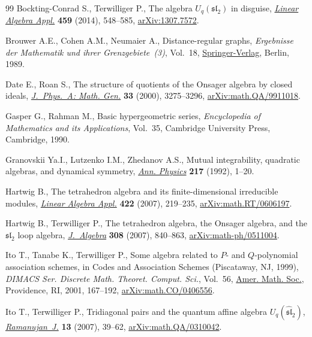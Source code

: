 \documentclass[pdftex]{sigma}
\numberwithin{equation}{section}
\begin{document}
\begin{thebibliography}{99}
Bockting-Conrad S., Terwilliger P., The algebra {$U_q(\mathfrak{sl}_2)$} in
 disguise, \href{https://doi.org/10.1016/j.laa.2014.07.022}{\textit{Linear Algebra Appl.}} \textbf{459} (2014), 548--585,
 \href{https://arxiv.org/abs/1307.7572}{arXiv:1307.7572}.

Brouwer A.E., Cohen A.M., Neumaier A., Distance-regular graphs,
 \textit{Ergebnisse der Mathematik und ihrer Grenzgebiete~(3)}, Vol.~18,
 \href{https://doi.org/10.1007/978-3-642-74341-2}{Springer-Verlag}, Berlin, 1989.

Date E., Roan S., The structure of quotients of the {O}nsager algebra by
 closed ideals, \href{https://doi.org/10.1088/0305-4470/33/16/316}{\textit{J.~Phys.~A: Math. Gen.}} \textbf{33} (2000),
 3275--3296, \href{https://arxiv.org/abs/math.QA/9911018}{arXiv:math.QA/9911018}.

Gasper G., Rahman M., Basic hypergeometric series, \textit{Encyclopedia of
 Mathematics and its Applications}, Vol.~35, Cambridge University Press,
 Cambridge, 1990.

Granovskii Ya.I., Lutzenko I.M., Zhedanov A.S., Mutual integrability, quadratic
 algebras, and dynamical symmetry, \href{https://doi.org/10.1016/0003-4916(92)90336-K}{\textit{Ann. Physics}} \textbf{217} (1992),
 1--20.

Hartwig B., The tetrahedron algebra and its finite-dimensional irreducible
 modules, \href{https://doi.org/10.1016/j.laa.2006.09.024}{\textit{Linear Algebra Appl.}} \textbf{422} (2007), 219--235,
 \href{https://arxiv.org/abs/math.RT/0606197}{arXiv:math.RT/0606197}.

Hartwig B., Terwilliger P., The tetrahedron algebra, the {O}nsager algebra, and
 the {$\mathfrak{sl}_2$} loop algebra, \href{https://doi.org/10.1016/j.jalgebra.2006.09.011}{\textit{J.~Algebra}} \textbf{308}
 (2007), 840--863, \href{https://arxiv.org/abs/math-ph/0511004}{arXiv:math-ph/0511004}.

Ito T., Tanabe K., Terwilliger P., Some algebra related to {$P$}- and
 {$Q$}-polynomial association schemes, in Codes and Association Schemes
 ({P}iscataway, {NJ}, 1999), \textit{DIMACS Ser. Discrete Math. Theoret.
 Comput. Sci.}, Vol.~56, \href{https://doi.org/10.1090/dimacs/056/14}{Amer. Math. Soc.}, Providence, RI, 2001, 167--192,
 \href{https://arxiv.org/abs/math.CO/0406556}{arXiv:math.CO/0406556}.

Ito T., Terwilliger P., Tridiagonal pairs and the quantum affine algebra
 {$U_q(\widehat{\mathfrak{sl}}_2)$}, \href{https://doi.org/10.1007/s11139-006-0242-4}{\textit{Ramanujan~J.}} \textbf{13} (2007),
 39--62, \href{https://arxiv.org/abs/math.QA/0310042}{arXiv:math.QA/0310042}.


\end{thebibliography}
\end{document}
